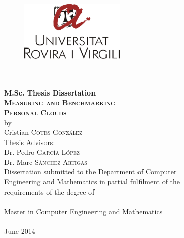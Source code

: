 \begin{titlepage}
\begin{center}
\begin{figure}
	\begin{center}
		\includegraphics[width=5cm]{figures/urv-logo.png}
	\end{center}
\end{figure}
\vspace*{0.3cm}
 \\
\vspace*{0.1cm}
 \\
\vspace*{0.6cm}
\noindent \Huge \textbf{M.Sc. Thesis Dissertation} \\
\vspace*{0.6cm}
\vspace*{0.3cm}
\noindent \Large \textbf{\textsc{Measuring and Benchmarking \\ Personal Clouds}}\\
\vspace*{0.4cm}
\noindent \large {by\\}
\noindent \LARGE Cristian \textsc{Cotes Gonz{\'a}lez} \\
\vspace*{1.3cm}
\noindent \Large {Thesis Advisors:} \\
\noindent \Large Dr. Pedro \textsc{Garc{\'i}a L{\'o}pez}\\
\noindent \Large Dr. Marc \textsc{S{\'a}nchez Artigas}\\
\vspace*{2.0cm}
\noindent \large Dissertation submitted to the Department of Computer \\
\noindent \large Engineering and Mathematics in partial fulfilment of the  \\
\noindent \large requirements of the degree of \\[0.5cm]
\noindent \large \\ Master in Computer Engineering and Mathematics
\\[1cm]
\noindent \large \\ June 2014
\vspace*{0.5cm}

\end{center}





\end{titlepage}
\sloppy

\titlepage
